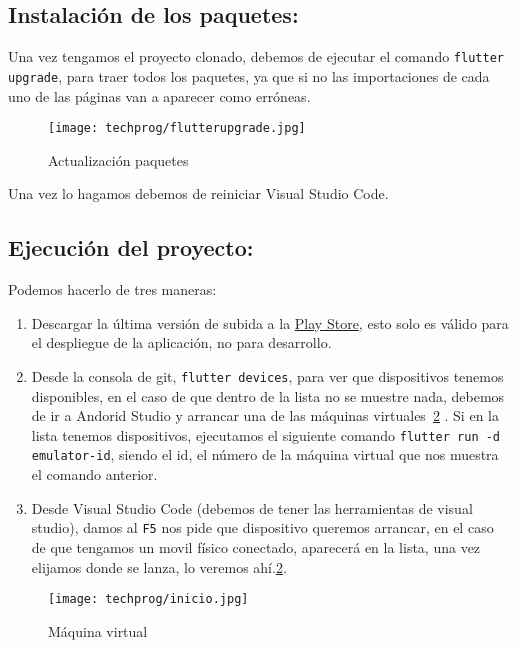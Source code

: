 \subsection{Instalación de los paquetes:}
Una vez tengamos el proyecto clonado, debemos de ejecutar el comando \texttt{flutter upgrade}, para traer todos los paquetes, ya que si no las importaciones de cada uno de las páginas van a aparecer como erróneas.

\begin{figure}[H]
	\centering
	\texttt{[image: techprog/flutterupgrade.jpg]}
	\caption{Actualización paquetes}\label{fig:upgrade}
\end{figure}

Una vez lo hagamos debemos de reiniciar Visual Studio Code.

\subsection{Ejecución del proyecto:}
Podemos hacerlo de tres maneras:
\begin{enumerate}
	\item Descargar la última versión de subida a la \href{https://play.google.com/store/apps/details?id=com.ubu.flutter_snake}{Play Store}, esto solo es válido para el despliegue de la aplicación, no para desarrollo.
	\item Desde la consola de git, \texttt{flutter devices}, para ver que dispositivos tenemos disponibles, en el caso de que dentro de la lista no se muestre nada, debemos de ir a Andorid Studio y arrancar una de las máquinas virtuales~\ref{fig:run} .
	Si en la lista tenemos dispositivos, ejecutamos el siguiente comando \texttt{flutter run -d emulator-id}, siendo el id, el número de la máquina virtual que nos muestra el comando anterior.
	\item Desde Visual Studio Code (debemos de tener las herramientas de visual studio), damos al \texttt{F5} nos pide que dispositivo queremos arrancar, en el caso de que tengamos un movil físico conectado, aparecerá en la lista, una vez elijamos donde se lanza, lo veremos ahí.\ref{fig:run}.
\end{enumerate} 	

\begin{figure}[H]
	\centering
	\texttt{[image: techprog/inicio.jpg]}
	\caption{Máquina virtual}\label{fig:run}
\end{figure}

